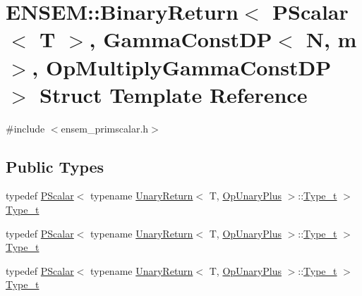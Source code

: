\hypertarget{structENSEM_1_1BinaryReturn_3_01PScalar_3_01T_01_4_00_01GammaConstDP_3_01N_00_01m_01_4_00_01OpMultiplyGammaConstDP_01_4}{}\section{E\+N\+S\+EM\+:\+:Binary\+Return$<$ P\+Scalar$<$ T $>$, Gamma\+Const\+DP$<$ N, m $>$, Op\+Multiply\+Gamma\+Const\+DP $>$ Struct Template Reference}
\label{structENSEM_1_1BinaryReturn_3_01PScalar_3_01T_01_4_00_01GammaConstDP_3_01N_00_01m_01_4_00_01OpMultiplyGammaConstDP_01_4}


{\ttfamily \#include $<$ensem\+\_\+primscalar.\+h$>$}

\subsection*{Public Types}
\begin{DoxyCompactItemize}
\item 
typedef \mbox{\hyperlink{classENSEM_1_1PScalar}{P\+Scalar}}$<$ typename \mbox{\hyperlink{structENSEM_1_1UnaryReturn}{Unary\+Return}}$<$ T, \mbox{\hyperlink{structENSEM_1_1OpUnaryPlus}{Op\+Unary\+Plus}} $>$\+::\mbox{\hyperlink{structENSEM_1_1BinaryReturn_3_01PScalar_3_01T_01_4_00_01GammaConstDP_3_01N_00_01m_01_4_00_01OpMultiplyGammaConstDP_01_4_a2d09643dd07c1169c27bfa1fb1582461}{Type\+\_\+t}} $>$ \mbox{\hyperlink{structENSEM_1_1BinaryReturn_3_01PScalar_3_01T_01_4_00_01GammaConstDP_3_01N_00_01m_01_4_00_01OpMultiplyGammaConstDP_01_4_a2d09643dd07c1169c27bfa1fb1582461}{Type\+\_\+t}}
\item 
typedef \mbox{\hyperlink{classENSEM_1_1PScalar}{P\+Scalar}}$<$ typename \mbox{\hyperlink{structENSEM_1_1UnaryReturn}{Unary\+Return}}$<$ T, \mbox{\hyperlink{structENSEM_1_1OpUnaryPlus}{Op\+Unary\+Plus}} $>$\+::\mbox{\hyperlink{structENSEM_1_1BinaryReturn_3_01PScalar_3_01T_01_4_00_01GammaConstDP_3_01N_00_01m_01_4_00_01OpMultiplyGammaConstDP_01_4_a2d09643dd07c1169c27bfa1fb1582461}{Type\+\_\+t}} $>$ \mbox{\hyperlink{structENSEM_1_1BinaryReturn_3_01PScalar_3_01T_01_4_00_01GammaConstDP_3_01N_00_01m_01_4_00_01OpMultiplyGammaConstDP_01_4_a2d09643dd07c1169c27bfa1fb1582461}{Type\+\_\+t}}
\item 
typedef \mbox{\hyperlink{classENSEM_1_1PScalar}{P\+Scalar}}$<$ typename \mbox{\hyperlink{structENSEM_1_1UnaryReturn}{Unary\+Return}}$<$ T, \mbox{\hyperlink{structENSEM_1_1OpUnaryPlus}{Op\+Unary\+Plus}} $>$\+::\mbox{\hyperlink{structENSEM_1_1BinaryReturn_3_01PScalar_3_01T_01_4_00_01GammaConstDP_3_01N_00_01m_01_4_00_01OpMultiplyGammaConstDP_01_4_a2d09643dd07c1169c27bfa1fb1582461}{Type\+\_\+t}} $>$ \mbox{\hyperlink{structENSEM_1_1BinaryReturn_3_01PScalar_3_01T_01_4_00_01GammaConstDP_3_01N_00_01m_01_4_00_01OpMultiplyGammaConstDP_01_4_a2d09643dd07c1169c27bfa1fb1582461}{Type\+\_\+t}}
\end{DoxyCompactItemize}


